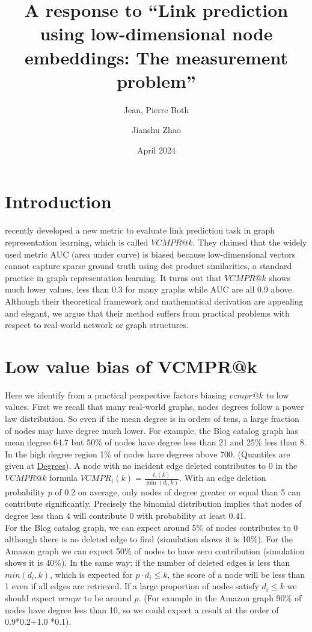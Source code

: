 \documentclass{article}
\title{A response to “Link prediction using low-dimensional node embeddings:
The measurement problem”}
\author[1,*]{Jean, Pierre Both}
\author[2]{Jianshu Zhao}
\affil[1]{Université Paris-Saclay, CEA, List, Palaiseau, France. (Retired)}
\affil[2]{Center for Bioinformatics and Computational Genomics, Georgia Institute of Technology, Atlanta, Georgia, USA}
\affil[*]{Corresponding author : jeanpierre.both@gmail.com}
\date{April 2024}
\begin{document}
\maketitle

\section{Introduction}

\citet{Menand} recently developed a new metric to evaluate link prediction task in graph representation learning, which is called $VCMPR@k$.
They claimed that the widely used metric AUC (area under curve) is biased because low-dimensional vectors cannot capture sparse ground truth using dot product similarities, a standard practice in graph representation learning.
It turns out that $VCMPR@k$ shows much lower values, less than 0.3 for many graphs while AUC are all 0.9 above. Although their theoretical framework and mathematical derivation are appealing and elegant, we argue that their method suffers from practical problems with respect to real-world network or graph structures.


\section{Low value bias of VCMPR@k}

Here we identify from a practical perspective factors biasing $vcmpr@k$ to low values.
First we recall that many real-world graphs, nodes degrees follow a power law distribution.
So even if the mean degree is in orders of tens, a large fraction of nodes may have degree much lower.
For example, the Blog catalog graph has mean degree 64.7 but 50\% of nodes have degree less than 21 and 25\% less than 8. In the high degree region 1\% of nodes have degrees above 700. (Quantiles are given at  \href{https://github.com/jean-pierreBoth/linkauc/tree/master/Degrees}{\color{blue}Degrees}).
A node with no incident edge deleted contributes to 0 in the $VCMPR@k$ formula $ VCMPR_{i}(k)= \frac{t_{i}(k)}{\min(d_{i},k)}$. With an edge deletion probability $p$ of 0.2 on average, only nodes of degree greater or equal than 5 can contribute significantly. Precisely the binomial distribution implies that nodes of degree less than 4 will contribute 0 with probability at least 0.41. \\
For the Blog catalog graph, we can expect around 5\% of nodes contributes to 0 although there is no deleted edge to find (simulation shows it is 10\%).
For the Amazon graph we can expect 50\% of nodes to have zero contribution (simulation shows it is 40\%).
In the same way: if the number of deleted edges is less than $min(d_{i},k)$, which is expected for $p \cdot d_{i} \leq k$, the score of a node will be less than 1 even if all edges are retrieved.
If a large proportion of nodes satisfy $d_{i} \le k$ we should expect $vcmpr$ to be around $p$. (For example in the Amazon graph 90\% of nodes have degree less than 10, so we could expect a result at the order of 0.9*0.2+1.0 *0.1).\\
\end{document}
